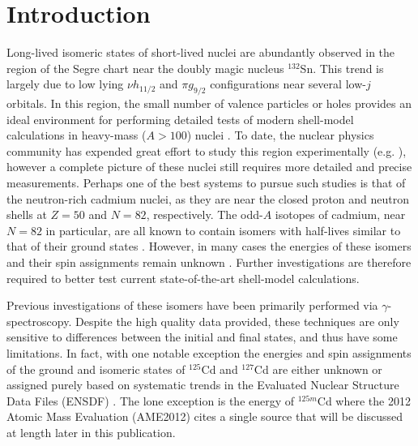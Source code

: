 \documentclass[twocolumn,prc,showpacs,preprintnumbers,amsmath,amssymb,superscriptaddress,nofootinbib,aps,10pt]{revtex4-1}
\begin{document}
\maketitle

\section{Introduction}
Long-lived isomeric states of short-lived nuclei are abundantly observed in the region of the Segre chart near the doubly magic nucleus $^{132}$Sn. This trend is largely due to low lying $\nu h_{11/2}$ and $\pi g_{9/2}$ configurations near several low-$j$ orbitals. In this region, the small number of valence particles or holes provides an ideal environment for performing detailed tests of modern shell-model calculations in heavy-mass ($A>100$) nuclei \cite{Walker1999}. To date, the nuclear physics community has expended great effort to study this region experimentally (e.g. \cite{Gorska2009,Yordanov2013,Hakala2012}), however a complete picture of these nuclei still requires more detailed and precise measurements. Perhaps one of the best systems to pursue such studies is that of the neutron-rich cadmium nuclei, as they are near the closed proton and neutron shells at $Z=50$ and $N=82$, respectively. The odd-$A$ isotopes of cadmium, near $N=82$ in particular, are all known to contain isomers with half-lives similar to that of their ground states \cite{Audi2012a}. However, in many cases the energies of these isomers and their spin assignments remain unknown \cite{ENSDF}. Further investigations are therefore required to better test current state-of-the-art shell-model calculations.

Previous investigations of these isomers have been primarily performed via $\gamma$-spectroscopy. Despite the high quality data provided, these techniques are only sensitive to differences between the initial and final states, and thus have some limitations. In fact, with one notable exception the energies and spin assignments of the ground and isomeric states of $^{125}$Cd and $^{127}$Cd are either unknown or assigned purely based on systematic trends in the Evaluated Nuclear Structure Data Files (ENSDF) \cite{ENSDF}. The lone exception is the energy of $^{125m}$Cd where the 2012 Atomic Mass Evaluation (AME2012) \cite{Audi2012,Wang2012} cites a single source \cite{Kankainen2013} that will be discussed at length later in this publication.
\end{document}
